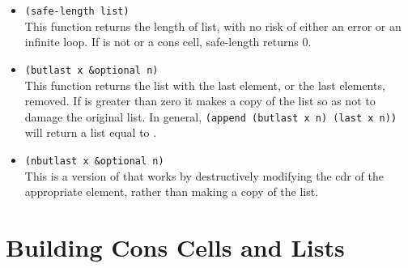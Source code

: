 \begin{itemize}
\item \lstinline|(safe-length list)|\\
  This function returns the length of list, with no risk of either an error or an infinite loop.
  If  is not  or a cons cell, safe-length returns 0.
\item \lstinline|(butlast x &optional n)|\\
  This function returns the list  with the last element, or the last  elements, removed.
  If  is greater than zero it makes a copy of the list so as not to damage the original list.
  In general, \lstinline|(append (butlast x n) (last x n))| will return a list equal to .
\item \lstinline|(nbutlast x &optional n)|\\
  This is a version of  that works by destructively modifying the cdr of the appropriate element, rather than making a copy of the list.
\end{itemize}

\section{Building Cons Cells and Lists}
\label{sec:building-cons-cells}


